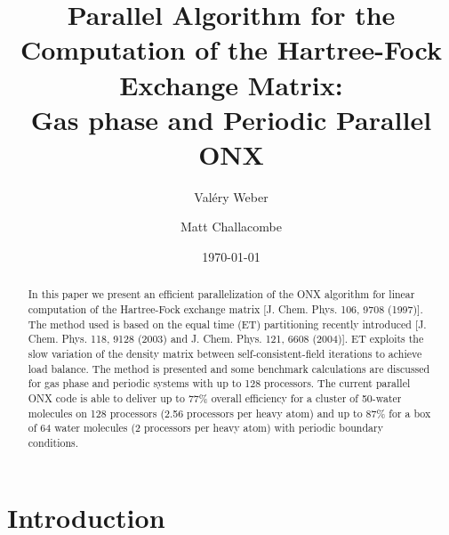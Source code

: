 \documentclass[prl,twocolumn,showpacs,twocolumngrid,superbib]{revtex4}
\begin{document}

\title{Parallel Algorithm for the Computation of the Hartree-Fock
       Exchange Matrix: \\ Gas phase and Periodic Parallel ONX}

\author{Val\'ery Weber}
%
\author{Matt Challacombe}%
%

\date{\today}%

\begin{abstract}
 In this paper we present an efficient parallelization
 of the ONX algorithm for linear computation of 
 the Hartree-Fock exchange matrix [J. Chem. Phys. 106, 9708 (1997)]. The method
 used is based on the equal time (ET) partitioning recently
 introduced [J. Chem. Phys. 118, 9128 (2003) and J. Chem. Phys. 121, 6608 (2004)]. 
 ET exploits the slow variation of the density matrix between self-consistent-field iterations
 to achieve load balance.
 The method is presented and some benchmark 
 calculations are discussed for gas phase and periodic systems
 with up to 128 processors.
 The current parallel ONX code is able to deliver up to 77\% overall
 efficiency for a cluster of 50-water molecules on 128 processors 
 (2.56 processors per heavy atom) and up to 87\% for a box of 64 
 water molecules (2 processors per heavy atom) with periodic boundary conditions.
 
\end{abstract}

\maketitle

\section{Introduction}
\end{document}
